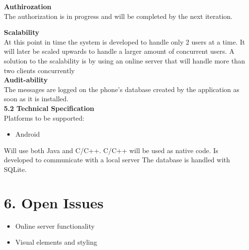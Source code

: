 \documentclass[29pt,a4paper]{moderncv}
\begin{document}
		\noindent \textbf{Authirozation}\\
		The authorization is in progress and will be completed by the next iteration.
		
		\noindent \textbf{Scalability}\\
		At this point in time the system is developed to handle only 2 users at a time. It will later be scaled upwards to handle a larger amount of concurrent users. A solution to the scalability is by using an online server that will handle more than two clients concurrently\\
		
		
		\noindent \textbf{Audit-ability}\\
		The messages are logged on the phone’s database created by the application as soon as it is installed.\\
		
		\noindent \textbf{5.2 Technical Specification}\\
		Platforms to be supported:
		\begin{itemize}
			\item Android
		\end{itemize}
		Will use both Java and C/C++. C/C++ will be used as native code.
		Is developed to communicate with a local server
		The database is handled with SQLite.\\
		
\newpage	
	\section*{\textbf{6. Open Issues}}
	\vspace{4mm}
		\begin{itemize}
			\item Online server functionality
			\item Visual elements and styling
		\end{itemize}
	\vspace{5mm}

\newpage	
\end{document}
